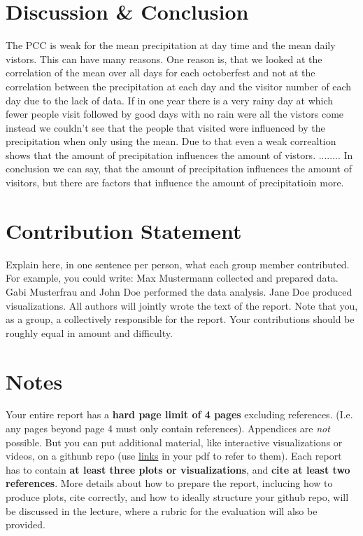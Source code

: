 \documentclass{article}
\theoremstyle{plain}
\theoremstyle{definition}
\theoremstyle{remark}
\begin{document}
\section{Discussion \& Conclusion}\label{sec:conclusion}
The PCC is weak for the mean precipitation at day time and the mean daily vistors. This can have many reasons. One reason is, that we looked at the correlation of the mean over all days for each octoberfest and not at the correlation between the precipitation at each day and the visitor number of each day due to the lack of data. If in one year there is a very rainy day at which fewer people visit followed by good days with no rain were all the vistors come instead we couldn't see that the people that visited were influenced by the precipitation when only using the mean. Due to that even a weak correaltion shows that the amount of precipitation influences the amount of vistors. ........ In conclusion we can say, that the amount of precipitation influences the amount of visitors, but there are factors that influence the amount of precipitatioin more.\\

\section*{Contribution Statement}

Explain here, in one sentence per person, what each group member contributed. For example, you could write: Max Mustermann collected and prepared data. Gabi Musterfrau and John Doe performed the data analysis. Jane Doe produced visualizations. All authors will jointly wrote the text of the report. Note that you, as a group, a collectively responsible for the report. Your contributions should be roughly equal in amount and difficulty.

\section*{Notes} 

Your entire report has a \textbf{hard page limit of 4 pages} excluding references. (I.e. any pages beyond page 4 must only contain references). Appendices are \emph{not} possible. But you can put additional material, like interactive visualizations or videos, on a githunb repo (use \href{https://github.com/pnkraemer/tueplots}{links} in your pdf to refer to them). Each report has to contain \textbf{at least three plots or visualizations}, and \textbf{cite at least two references}. More details about how to prepare the report, inclucing how to produce plots, cite correctly, and how to ideally structure your github repo, will be discussed in the lecture, where a rubric for the evaluation will also be provided.




\end{document}
